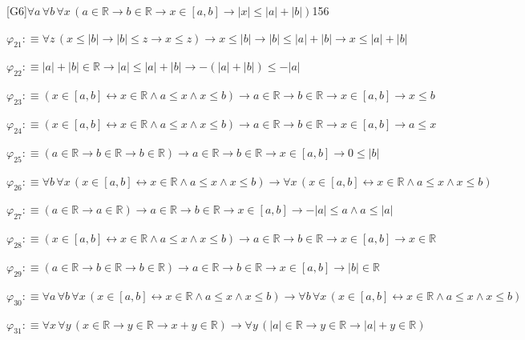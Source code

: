\begin{fullproof}{[G6]}{$\forall a\,\forall b\,\forall x\,(a \in \mathbb{R} \to b \in \mathbb{R} \to x \in [a,b] \to \lvert x \rvert \leq \lvert a \rvert + \lvert b \rvert)$}{156}
\begin{abbrevlist}
\item $\varphi_{21} :\equiv \forall z\,(x \leq \lvert b \rvert \to \lvert b \rvert \leq z \to x \leq z) \to x \leq \lvert b \rvert \to \lvert b \rvert \leq \lvert a \rvert + \lvert b \rvert \to x \leq \lvert a \rvert + \lvert b \rvert$
\item $\varphi_{22} :\equiv \lvert a \rvert + \lvert b \rvert \in \mathbb{R} \to \lvert a \rvert \leq \lvert a \rvert + \lvert b \rvert \to -(\lvert a \rvert + \lvert b \rvert) \leq -\lvert a \rvert$
\item $\varphi_{23} :\equiv (x \in [a,b] \leftrightarrow x \in \mathbb{R} \land a \leq x \land x \leq b) \to a \in \mathbb{R} \to b \in \mathbb{R} \to x \in [a,b] \to x \leq b$
\item $\varphi_{24} :\equiv (x \in [a,b] \leftrightarrow x \in \mathbb{R} \land a \leq x \land x \leq b) \to a \in \mathbb{R} \to b \in \mathbb{R} \to x \in [a,b] \to a \leq x$
\item $\varphi_{25} :\equiv (a \in \mathbb{R} \to b \in \mathbb{R} \to b \in \mathbb{R}) \to a \in \mathbb{R} \to b \in \mathbb{R} \to x \in [a,b] \to 0 \leq \lvert b \rvert$
\item $\varphi_{26} :\equiv \forall b\,\forall x\,(x \in [a,b] \leftrightarrow x \in \mathbb{R} \land a \leq x \land x \leq b) \to \forall x\,(x \in [a,b] \leftrightarrow x \in \mathbb{R} \land a \leq x \land x \leq b)$
\item $\varphi_{27} :\equiv (a \in \mathbb{R} \to a \in \mathbb{R}) \to a \in \mathbb{R} \to b \in \mathbb{R} \to x \in [a,b] \to -\lvert a \rvert \leq a \land a \leq \lvert a \rvert$
\item $\varphi_{28} :\equiv (x \in [a,b] \leftrightarrow x \in \mathbb{R} \land a \leq x \land x \leq b) \to a \in \mathbb{R} \to b \in \mathbb{R} \to x \in [a,b] \to x \in \mathbb{R}$
\item $\varphi_{29} :\equiv (a \in \mathbb{R} \to b \in \mathbb{R} \to b \in \mathbb{R}) \to a \in \mathbb{R} \to b \in \mathbb{R} \to x \in [a,b] \to \lvert b \rvert \in \mathbb{R}$
\item $\varphi_{30} :\equiv \forall a\,\forall b\,\forall x\,(x \in [a,b] \leftrightarrow x \in \mathbb{R} \land a \leq x \land x \leq b) \to \forall b\,\forall x\,(x \in [a,b] \leftrightarrow x \in \mathbb{R} \land a \leq x \land x \leq b)$
\item $\varphi_{31} :\equiv \forall x\,\forall y\,(x \in \mathbb{R} \to y \in \mathbb{R} \to x + y \in \mathbb{R}) \to \forall y\,(\lvert a \rvert \in \mathbb{R} \to y \in \mathbb{R} \to \lvert a \rvert + y \in \mathbb{R})$

\end{abbrevlist}
\end{fullproof}
